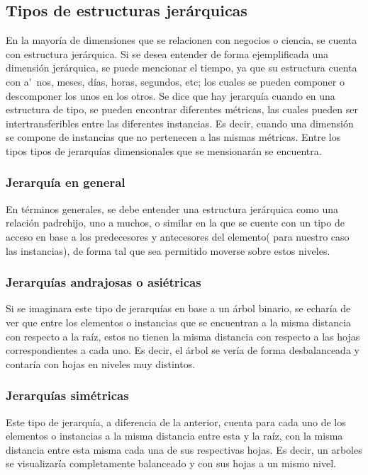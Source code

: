 \documentclass[DIV=calc, paper=a4, fontsize=11pt, twocolumn]{scrartcl}	 %
\begin{document}
\subsection*{Tipos de estructuras jer\'{a}rquicas}

En la mayor\'{i}a de dimensiones que se relacionen con negocios o ciencia, se cuenta con estructura jer\'{a}rquica. Si se desea entender de forma ejemplificada una dimensi\'{o}n jer\'{a}rquica, se puede mencionar el tiempo, ya que su estructura cuenta con a\'~{n}os, meses, d\'{i}as, horas, segundos, etc; los cuales se pueden componer o descomponer los unos en los otros.
Se dice que hay jerarqu\'{i}a cuando en una estructura de tipo, se pueden encontrar diferentes m\'{e}tricas, las cuales pueden ser intertransferibles entre las diferentes instancias. Es decir, cuando una dimensi\'{o}n se compone de instancias que no pertenecen a las mismas m\'{e}tricas.
Entre los tipos tipos de jerarqu\'{i}as dimensionales que se mensionar\'{a}n se encuentra.

\subsubsection*{Jerarqu\'{i}a en general}
En t\'{e}rminos generales, se debe entender una estructura jer\'{a}rquica como una relaci\'{o}n padre\-hijo, uno a muchos, o similar en la que se cuente con un tipo de acceso en base a los predecesores y antecesores del elemento( para nuestro caso las instancias), de forma tal que sea permitido moverse sobre estos niveles.

\subsubsection*{Jerarqu\'{i}as andrajosas o asi\'{e}tricas}
Si se imaginara este tipo de jerarqu\'{i}as en base a un \'{a}rbol binario, se echar\'{i}a de ver que entre los elementos o instancias que se encuentran a la misma distancia con respecto a la ra\'{i}z, estos no tienen la misma distancia con respecto a las hojas correspondientes a cada uno. Es decir, el \'{a}rbol se ver\'{i}a de forma desbalanceada y contar\'{i}a con hojas en niveles muy distintos.

\subsubsection*{Jerarqu\'{i}as sim\'{e}tricas}
Este tipo de jerarqu\'{i}a, a diferencia de la anterior, cuenta para cada uno de los elementos o instancias a la misma distancia entre esta y la ra\'{i}z, con la misma distancia entre esta misma cada una de sus respectivas hojas. Es decir, un arboles se visualizar\'{i}a completamente balanceado y con sus hojas a un mismo nivel.
\end{document}
